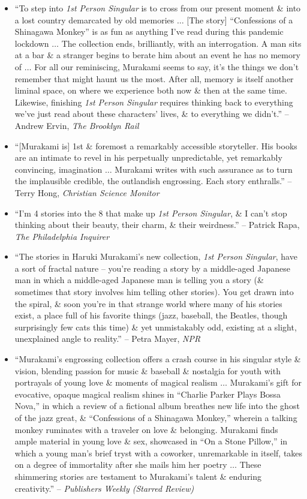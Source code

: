 \documentclass{article}
\begin{document}
\begin{enumerate}
\begin{itemize}
		\item ``To step into {\it1st Person Singular} is to cross from our present moment \& into a lost country demarcated by old memories $\ldots$ [The story] ``Confessions of a Shinagawa Monkey'' is as fun as anything I've read during this pandemic lockdown $\ldots$ The collection ends, brilliantly, with an interrogation. A man sits at a bar \& a stranger begins to berate him about an event he has no memory of $\ldots$ For all our reminiscing, {\sc Murakami} seems to say, it's the things we don't remember that might haunt us the most. After all, memory is itself another liminal space, on where we experience both now \& then at the same time. Likewise, finishing {\it1st Person Singular} requires thinking back to everything we've just read about these characters' lives, \& to everything we didn't.'' -- {\sc Andrew Ervin}, {\it The Brooklyn Rail}
		\item ``[{\sc Murakami} is] 1st \& foremost a remarkably accessible storyteller. His books are an intimate to revel in his perpetually unpredictable, yet remarkably convincing, imagination $\ldots$ {\sc Murakami} writes with such assurance as to turn the implausible credible, the outlandish engrossing. Each story enthralls.'' -- {\sc Terry Hong}, {\it Christian Science Monitor}
		\item ``I'm 4 stories into the 8 that make up {\it1st Person Singular}, \& I can't stop thinking about their beauty, their charm, \& their weirdness.'' -- {\sc Patrick Rapa}, {\it The Philadelphia Inquirer}
		\item ``The stories in {\sc Haruki Murakami}'s new collection, {\it1st Person Singular}, have a sort of fractal nature -- you're reading a story by a middle-aged Japanese man in which a middle-aged Japanese man is telling you a story (\& sometimes that story involves him telling other stories). You get drawn into the spiral, \& soon you're in that strange world where many of his stories exist, a place full of his favorite things (jazz, baseball, the Beatles, though surprisingly few cats this time) \& yet unmistakably odd, existing at a slight, unexplained angle to reality.'' -- {\sc Petra Mayer}, {\it NPR}
		\item ``{\sc Murakami}'s engrossing collection offers a crash course in his singular style \& vision, blending passion for music \& baseball \& nostalgia for youth with portrayals of young love \& moments of magical realism $\ldots$ {\sc Murakami}'s gift for evocative, opaque magical realism shines in ``Charlie Parker Plays Bossa Nova,'' in which a review of a fictional album breathes new life into the ghost of the jazz great, \& ``Confessions of a Shinagawa Monkey,'' wherein a talking monkey ruminates with a traveler on love \& belonging. {\sc Murakami} finds ample material in young love \& sex, showcased in ``On a Stone Pillow,'' in which a young man's brief tryst with a coworker, unremarkable in itself, takes on a degree of immortality after she mails him her poetry $\ldots$ These shimmering stories are testament to {\sc Murakami}'s talent \& enduring creativity.'' -- {\it Publishers Weekly (Starred Review)}

\end{itemize}
\end{enumerate}
\end{document}
